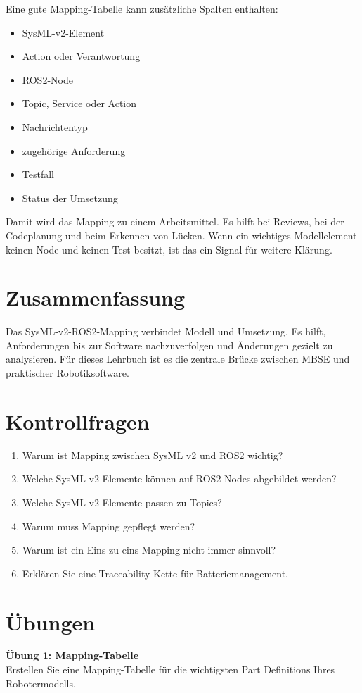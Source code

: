 Eine gute Mapping-Tabelle kann zusätzliche Spalten enthalten:

\begin{itemize}
    \item SysML-v2-Element
    \item Action oder Verantwortung
    \item ROS2-Node
    \item Topic, Service oder Action
    \item Nachrichtentyp
    \item zugehörige Anforderung
    \item Testfall
    \item Status der Umsetzung
\end{itemize}

Damit wird das Mapping zu einem Arbeitsmittel. Es hilft bei Reviews, bei der Codeplanung und beim Erkennen von Lücken. Wenn ein wichtiges Modellelement keinen Node und keinen Test besitzt, ist das ein Signal für weitere Klärung.

\section{Zusammenfassung}
Das SysML-v2-ROS2-Mapping verbindet Modell und Umsetzung. Es hilft, Anforderungen bis zur Software nachzuverfolgen und Änderungen gezielt zu analysieren. Für dieses Lehrbuch ist es die zentrale Brücke zwischen MBSE und praktischer Robotiksoftware.

\section{Kontrollfragen}
\begin{enumerate}
    \item Warum ist Mapping zwischen SysML v2 und ROS2 wichtig?
    \item Welche SysML-v2-Elemente können auf ROS2-Nodes abgebildet werden?
    \item Welche SysML-v2-Elemente passen zu Topics?
    \item Warum muss Mapping gepflegt werden?
    \item Warum ist ein Eins-zu-eins-Mapping nicht immer sinnvoll?
    \item Erklären Sie eine Traceability-Kette für Batteriemanagement.
\end{enumerate}

\section{Übungen}
\begin{uebungbox}
\textbf{Übung 1: Mapping-Tabelle}\\
Erstellen Sie eine Mapping-Tabelle für die wichtigsten Part Definitions Ihres Robotermodells.
\end{uebungbox}

